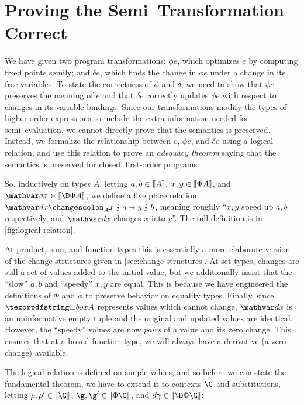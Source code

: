 \section{Proving the Semi\naive\ Transformation Correct}
\label{sec:logical-relation}

We have given two program transformations: $\phi e$, which optimizes $e$ by
computing fixed points semi\naive{}ly; and $\delta e$, which finds the change in
$\phi e$ under a change in its free variables.
%
To state the correctness of $\phi$ and $\delta$, we need to show that $\phi e$
preserves the meaning of $e$ and that $\delta e$ correctly updates $\phi e$ with
respect to changes in its variable bindings.
%
Since our transformations modify the types of higher-order expressions to
include the extra information needed for semi\naive\ evaluation, we cannot
directly prove that the semantics is preserved.
%
Instead, we formalize the relationship between $e$, $\phi e$, and $\delta e$
using a logical relation, and use this relation to prove an \emph{adequacy
  theorem} saying that the semantics is preserved for closed, first-order
programs.



So, inductively on types $A$, letting $a,b \in \llbracket{A}\rrbracket$, $x,y \in \llbracket{\Phi A}\rrbracket$,
and $\dx \in \den{\DP A}$, we define a five place relation
$\weirdat{A}{\dx}{x}{a}{y}{b}$, meaning roughly ``$x,y$ speed up $a,b$
respectively, and $\dx$ changes $x$ into $y$''. The full definition is in
\cref{fig:logical-relation}.

At product, sum, and function types this is essentially a more elaborate version
of the change structures given in \cref{sec:change-structures}.
%
At set types, changes are still a set of values added to the initial value, but
we additionally insist that the ``slow'' $a,b$ and ``speedy'' $x,y$ are equal.
%
This is because we have engineered the definitions of $\Phi$ and $\phi$ to
preserve behavior on equality types.
%
Finally, since $\iso A$ represents values which cannot change, $\dx$ is an
uninformative empty tuple and the original and updated values are identical.
%
However, the ``speedy'' values are now \emph{pairs} of a value and its zero
change.
%
This ensures that at a boxed function type, we will always have a derivative (a
zero change) available.

The logical relation is defined on simple values, and so before we can state the
fundamental theorem, we have to extend it to contexts $\G$ and substitutions,
letting $\rho,\rho' \in \den{\G}$, $\g,\g' \in \den{\Phi\G}$, and $\dgamma \in
\den{\DP\G}$:

